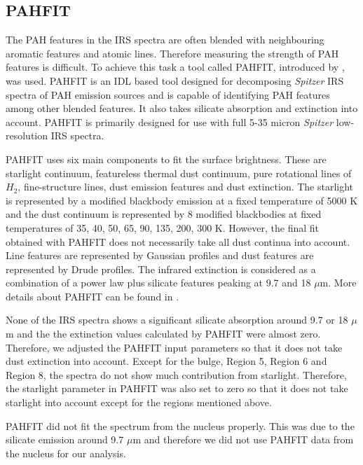 \subsection{PAHFIT}

The PAH features in the IRS spectra are often blended with neighbouring aromatic features and atomic lines. Therefore measuring the strength of PAH features is difficult. To achieve this task a tool called PAHFIT, introduced by \citet{Smith:2007lr}, was used. PAHFIT is an IDL  based tool designed for decomposing {\em Spitzer} IRS spectra of PAH emission sources and is capable of identifying PAH features among other blended features. It also takes silicate absorption and extinction into account. PAHFIT is primarily designed for use with full 5-35 micron {\em Spitzer} low-resolution IRS spectra.

PAHFIT uses six main components to fit the surface brightness. These are starlight continuum, featureless thermal dust continuum, pure rotational lines of $H_2$, fine-structure lines, dust emission features and dust extinction. The starlight is represented by a modified blackbody emission at a fixed temperature of 5000 K and the dust continuum is represented by 8 modified blackbodies at fixed temperatures of 35, 40, 50, 65, 90, 135, 200, 300 K. However, the final fit obtained with PAHFIT does not necessarily take all dust continua into account. Line features are represented by Gaussian profiles and dust features are represented by Drude profiles. The infrared extinction is considered as a combination of a power law plus silicate features peaking at 9.7 and 18 $\mu$m. More details about PAHFIT can be found in \citet{Smith:2007lr}.

None of the IRS spectra shows a significant silicate absorption around 9.7 or 18 $\mu$m and the the extinction values calculated by PAHFIT were almost zero. Therefore, we adjusted the PAHFIT input parameters so that it does not take dust extinction into account. Except for the bulge, Region 5, Region 6 and Region 8, the spectra do not show much contribution from starlight. Therefore, the starlight parameter in PAHFIT was also set to zero so that it does not take starlight into account except for the regions mentioned above. 

PAHFIT did not fit the spectrum from the nucleus properly. This was due to the silicate emission around 9.7 $\mu$m and therefore we did not use PAHFIT data from the nucleus for our analysis.





